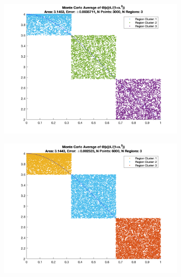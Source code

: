 \documentclass[12pt]{article}
\begin{document}
\begin{figure}[htp]
\begin{subfigure}{0.49\columnwidth}
\centering
\includegraphics[width=\textwidth]{problem_1_n_3000.png}
\caption{}
\label{fig:time3}
\end{subfigure}\hfill
\begin{subfigure}{0.49\columnwidth}
\centering
\includegraphics[width=\textwidth]{problem_1_n_6000.png}
\caption{}
\label{fig:time4}
\end{subfigure}

\medskip


\end{figure}
\end{document}
